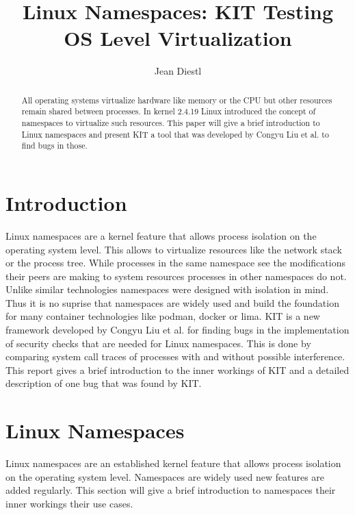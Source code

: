 \documentclass[10pt,twocolumn,a4paper]{article}
\author{Jean Diestl}
\begin{document}
\title{Linux Namespaces: KIT Testing OS Level Virtualization}

\newcommand{\todo}[1]{{\texttt{[#1]}}}
\newcommand{\code}[1]{{\tt \small{#1}}}

\maketitle

\lstset{language=C, basicstyle=\ttfamily,
        columns=fullflexible,
        string=[b]', showspaces=false, showtabs=false,
         captionpos=b,
        framerule=1pt,
        breaklines=true, breakatwhitespace=true,
        autogobble=true}

\begin{abstract}
All operating systems virtualize hardware like memory or the CPU but other resources remain shared between processes.
In kernel 2.4.19 Linux introduced the concept of namespaces to virtualize such resources. This paper will give a brief 
introduction to Linux namespaces and present KIT a tool that was developed by Congyu Liu et al. to
find bugs in those.
\end{abstract}

\section{Introduction}\label{sec:introduction}
Linux namespaces are a kernel feature that allows process isolation on the operating system level.
This allows to virtualize resources like the network stack or the process tree.
While processes in the same namespace see the modifications their peers are making to system resources
processes in other namespaces do not. Unlike similar technologies namespaces were designed with
isolation in mind. Thus it is no suprise that namespaces are widely used and build the foundation
for many container technologies like podman, docker or lima.
KIT is a new framework developed by Congyu Liu et al. for finding bugs in the implementation of
security checks that are needed for Linux namespaces\cite{0}. 
This is done by comparing system call traces of processes with and without possible interference.
This report gives a brief introduction to the inner
workings of KIT and a detailed description of one bug
that was found by KIT. 

\section{Linux Namespaces}
Linux namespaces are an established kernel feature that allows process isolation on the operating system level.
Namespaces are widely used new features are added regularly.
This section will give a brief introduction to namespaces their inner workings their use cases.
\end{document}
